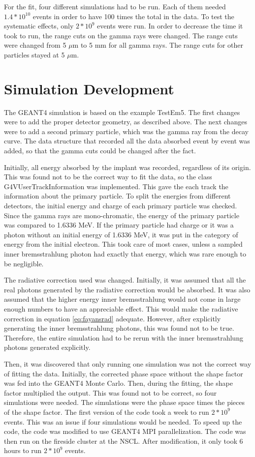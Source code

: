 \documentclass[../MaxHughesThesis.tex]{subfiles}
\begin{document}
For the fit, four different simulations had to be run.
Each of them needed $1.4 * 10^{10}$ events in order to have 100 times the total in the data.
To test the systematic effects, only $2 * 10^{9}$ events were run.
In order to decrease the time it took to run, the range cuts on the gamma rays were changed.
The range cuts were changed from 5 $\mu$m to 5 mm for all gamma rays.
The range cuts for other particles stayed at 5 $\mu$m.

\section{Simulation Development}
The GEANT4 simulation is based on the example TestEm5.
The first changes were to add the proper detector geometry, as described above.
The next changes were to add a second primary particle, which was the gamma ray from the decay curve.
The data structure that recorded all the data absorbed event by event was added, so that the gamma cuts could be changed after the fact.

Initially, all energy absorbed by the implant was recorded, regardless of its origin.
This was found not to be the correct way to fit the data, so the class G4VUserTrackInformation was implemented.
This gave the each track the information about the primary particle.
To split the energies from different detectors, the initial energy and charge of each primary particle was checked.
Since the gamma rays are mono-chromatic, the energy of the primary particle was compared to 1.6336 MeV.
If the primary particle had charge or it was a photon without an initial energy of 1.6336 MeV, it was put in the category of energy from the initial electron. 
This took care of most cases, unless a sampled inner bremsstrahlung photon had exactly that energy, which was rare enough to be negligible.

The radiative correction used was changed.
Initially, it was assumed that all the real photons generated by the radiative correction would be absorbed.
It was also assumed that the higher energy inner bremsstrahlung would not come in large enough numbers to have an appreciable effect. 
This would make the radiative correction in equation \ref{eq:fayansrad} adequate. 
However, after explicitly generating the inner bremsstrahlung photons, this was found not to be true.
Therefore, the entire simulation had to be rerun with the inner bremsstrahlung photons generated explicitly.

Then, it was discovered that only running one simulation was not the correct way of fitting the data.
Initially, the corrected phase space without the shape factor was fed into the GEANT4 Monte Carlo.
Then, during the fitting, the shape factor multiplied the output. 
This was found not to be correct, so four simulations were needed.
The simulations were the phase space times the pieces of the shape factor.
The first version of the code took a week to run $2 * 10^{9}$ events.
This was an issue if four simulations would be needed.
To speed up the code, the code was modified to use GEANT4 MPI parallelization.
The code was then run on the fireside cluster at the NSCL.
After modification, it only took 6 hours to run $2 * 10^{9}$ events.
\end{document}
